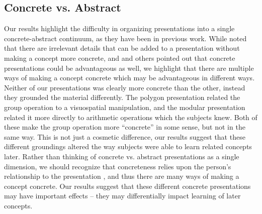 \documentclass[man,10pt]{apa6}
\begin{document}
\subsection{Concrete vs. Abstract}
Our results highlight the difficulty in organizing presentations into a single concrete-abstract continuum, as they have been in previous work. While  noted that there are irrelevant details that can be added to a presentation without making a concept more concrete, and  and others pointed out that concrete presentations could be advantageous as well, we highlight that there are multiple ways of making a concept concrete which may be advantageous in different ways. Neither of our presentations was clearly more concrete than the other, instead they grounded the material differently. The polygon presentation related the group operation to a visuospatial manipulation, and the modular presentation related it more directly to arithmetic operations which the subjects knew. Both of these make the group operation more ``concrete'' in some sense, but not in the same way. This is not just a cosmetic difference, our results suggest that these different groundings altered the way subjects were able to learn related concepts later. Rather than thinking of concrete vs. abstract presentations as a single dimension, we should recognize that concreteness relies upon the person's relationship to the presentation \cite{Wilensky1991}, and thus there are many ways of making a concept concrete. Our results suggest that these different concrete presentations may have important effects -- they may differentially impact learning of later concepts. \par
\end{document}
